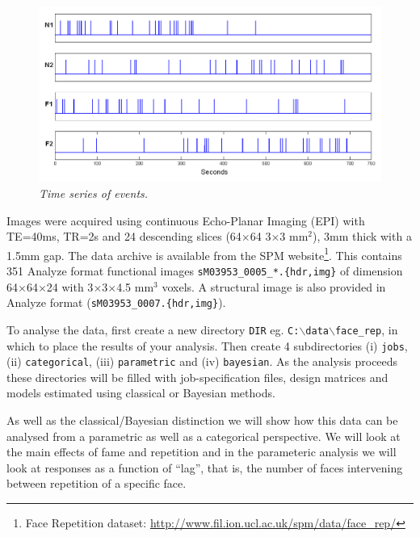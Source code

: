 \begin{figure}
\begin{center}
\includegraphics[width=140mm]{faces/face_timing}
\caption{\em Time series of events. \label{face_timing}}
\end{center}
\end{figure}

Images were acquired using continuous Echo-Planar Imaging (EPI) with TE=40ms, TR=2s and 24 descending slices (64$\times$64 3$\times$3 mm$^2$), 3mm thick with a 1.5mm gap.
The data archive is available from the SPM website\footnote{Face Repetition dataset: \url{http://www.fil.ion.ucl.ac.uk/spm/data/face_rep/}}.
This contains 351 Analyze format functional images \texttt{sM03953\_0005\_*.\{hdr,img\}} of dimension 64$\times$64$\times$24 with 3$\times$3$\times$4.5 mm$^3$ voxels. A structural image is also provided  in Analyze format (\texttt{sM03953\_0007.\{hdr,img\}}).

To analyse the data, first create a new directory \texttt{DIR} eg. \texttt{C:$\backslash$data$\backslash$face\_rep}, in which to place the results of your analysis. Then create 4 subdirectories (i) \texttt{jobs}, (ii) \texttt{categorical}, (iii)  \texttt{parametric} and (iv) \texttt{bayesian}. As the analysis proceeds these directories will be filled with job-specification files, design matrices and models estimated using classical or Bayesian methods. 

As well as the classical/Bayesian distinction we will show how this data can be analysed from a parametric as well as a categorical perspective. We will look at the 
main effects of fame and repetition and in the parameteric analysis we will look at responses as a function of ``lag'', that is, the number of faces intervening between repetition of a specific face.

